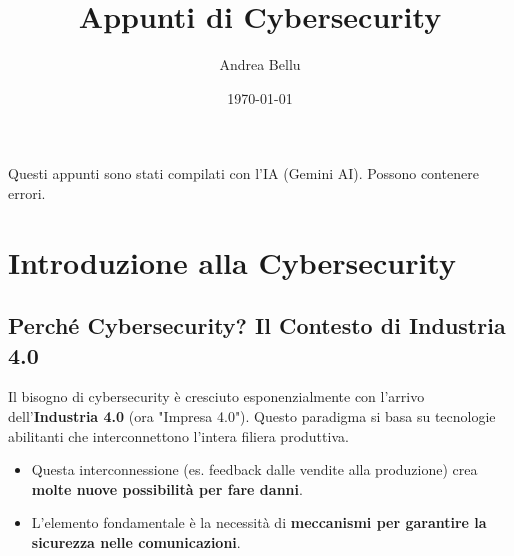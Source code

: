 \documentclass[a4paper,12pt]{article}
\title{\vspace{-2em}\textbf{\Huge Appunti di Cybersecurity}\vspace{-0.5em}}
\author{\Large Andrea Bellu}
\date{\today}
\begin{document}
\noindent
\maketitle

{\scriptsize Questi appunti sono stati compilati con l’IA (Gemini AI). Possono contenere errori.}

\tableofcontents
\newpage

\section{Introduzione alla Cybersecurity}

\subsection{Perché Cybersecurity? Il Contesto di Industria 4.0}
Il bisogno di cybersecurity è cresciuto esponenzialmente con l'arrivo dell'\textbf{Industria 4.0} (ora "Impresa 4.0"). Questo paradigma si basa su tecnologie abilitanti che interconnettono l'intera filiera produttiva.
\begin{itemize}
    \item Questa interconnessione (es. feedback dalle vendite alla produzione) crea \textbf{molte nuove possibilità per fare danni}.
    \item L'elemento fondamentale è la necessità di \textbf{meccanismi per garantire la sicurezza nelle comunicazioni}.
\end{itemize}
\end{document}
